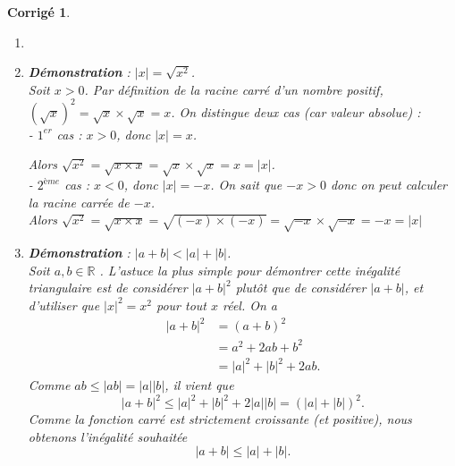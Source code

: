 \documentclass[11pt,french,table]{article}
\theoremstyle{exercice}
\theoremstyle{corrigé}
\newtheorem{corrigé}{Corrigé}
\begin{document}
\vspace{1em}
\begin{corrigé}
      \begin{enumerate}
          \item[]
          \item
      \textbf{Démonstration} : $|x|=\sqrt{x^2}$. \\
      Soit $x>0$. Par définition de la racine carré d’un nombre positif, $({\sqrt{x}})^2 = \sqrt{x} \times \sqrt{x} = x$. On distingue deux cas (car valeur absolue) : \\
- $1^{er}$ cas : $x>0$, donc $\vert x \vert = x$.

Alors $\sqrt{x^2} = \sqrt{x \times x} = \sqrt{x} \times \sqrt{x} = x = \vert x \vert$. \\
- $2^{ème}$ cas : $x<0$, donc $\vert x \vert = -x$. On sait que $-x > 0$ donc on peut calculer la racine carrée de $-x$.\\
Alors $\sqrt{x^2} = \sqrt{x \times x} = \sqrt{(-x) \times (-x)} = \sqrt{-x} \times \sqrt{-x} = -x = \vert x \vert$

\item \textbf{Démonstration} : $|a+b|<|a|+|b|$. \\
Soit $a,b\in \mathbb{R}$ .
L'astuce la plus simple pour démontrer cette inégalité triangulaire est de considérer $|a+b|^2$ 
plutôt que de considérer $|a+b|$, et d'utiliser que $|x|^2=x^2$ pour tout $x$ réel. On a \begin{equation*}
\begin{aligned}
    |a+b|^2 &=(a+b)^2 \\
    &= a^2 + 2ab + b^2 \\
    &= |a|^2 + |b|^2 + 2ab.
    \end{aligned}
\end{equation*}
 Comme $ab\leq |ab|=|a||b|$, il vient que \begin{equation*}
     |a+b|^2 \leq |a|^2+|b|^2+2|a||b|=(|a|+|b|)^2.
 \end{equation*}
Comme la fonction  carré est strictement croissante (et positive), nous obtenons l'inégalité souhaitée \begin{equation*}
    |a+b|\leq |a|+|b|.
\end{equation*}


\end{enumerate}
\end{corrigé}
\vspace{1em}
\end{document}
